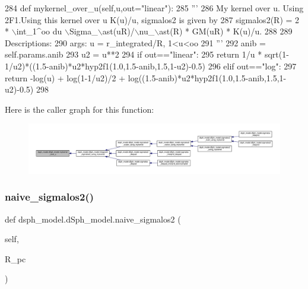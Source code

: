 \begin{DoxyCode}
284     \textcolor{keyword}{def }mykernel\_over\_u(self,u,out="linear"):
285         \textcolor{stringliteral}{'''}
286 \textcolor{stringliteral}{        My kernel over u. Using 2F1.Using this kernel over u K(u)/u, sigmalos2 is given by}
287 \textcolor{stringliteral}{            sigmalos2(R) = 2 * \(\backslash\)int\_1^oo du \(\backslash\)Sigma\_\(\backslash\)ast(uR)/\(\backslash\)nu\_\(\backslash\)ast(R) * GM(uR) * K(u)/u.}
288 \textcolor{stringliteral}{            }
289 \textcolor{stringliteral}{        Descriptions:}
290 \textcolor{stringliteral}{            args: u = r\_integrated/R, 1<u<oo}
291 \textcolor{stringliteral}{        '''}
292         anib = self.params.anib
293         u2 = u**2
294         \textcolor{keywordflow}{if} out==\textcolor{stringliteral}{"linear"}:
295             \textcolor{keywordflow}{return} 1/u * sqrt(1-1/u2)*((1.5-anib)*u2*hyp2f1(1.0,1.5-anib,1.5,1-u2)-0.5)
296         \textcolor{keywordflow}{elif} out==\textcolor{stringliteral}{"log"}:
297             \textcolor{keywordflow}{return} -log(u) + log(1-1/u2)/2 + log((1.5-anib)*u2*hyp2f1(1.0,1.5-anib,1.5,1-u2)-0.5)
298 
\end{DoxyCode}
Here is the caller graph for this function\+:\nopagebreak
\begin{figure}[H]
\begin{center}
\leavevmode
\includegraphics[width=350pt]{d0/d25/classdsph__model_1_1dSph__model_a5e0091742da19919dc6c085a806ad6e0_icgraph}
\end{center}
\end{figure}
\mbox{\label{classdsph__model_1_1dSph__model_a9db5b642eb5007933136db35b3acf84a}} 
\subsubsection{\texorpdfstring{naive\+\_\+sigmalos2()}{naive\_sigmalos2()}}
{\footnotesize\ttfamily def dsph\+\_\+model.\+d\+Sph\+\_\+model.\+naive\+\_\+sigmalos2 (\begin{DoxyParamCaption}\item[{}]{self,  }\item[{}]{R\+\_\+pc }\end{DoxyParamCaption})}



